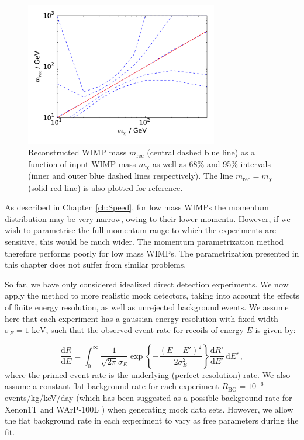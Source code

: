 \begin{figure}[t]
\centering
  \includegraphics[width=0.75\textwidth]{Poly/VaryingM.pdf}
  \caption{Reconstructed WIMP mass $m_\textrm{rec}$ (central dashed blue line) as a function of input WIMP mass $m_\chi$ as well as 68\% and 95\% intervals (inner and outer blue dashed lines respectively). The line $m_\textrm{rec} = m_\chi$ (solid red line) is also plotted for reference.}
  \label{fig:Poly:VaryingM}
\end{figure}

As described in Chapter~\ref{ch:Speed}, for low mass WIMPs the momentum distribution may be very narrow, owing to their lower momenta. However, if we wish to parametrise the full momentum range to which the experiments are sensitive, this would be much wider.  The momentum parametrization method therefore performs poorly for low mass WIMPs. The parametrization presented in this chapter does not suffer from similar problems.

So far, we have only considered idealized direct detection experiments. We now apply the method to more realistic mock detectors, taking into account the effects of finite energy resolution, as well as unrejected background events. We assume here that each experiment has a gaussian energy resolution with fixed width $\sigma_E = 1 \textrm{ keV}$, such that the observed event rate for recoils of energy $E$ is given by: 

\begin{equation}
\frac{\textrm{d}R}{\textrm{d}E} = \int_{0}^{\infty} \frac{1}{\sqrt{2 \pi} \sigma_E}\exp\left\{-\frac{(E-E')^2}{2\sigma_E^2}\right\} \frac{\textrm{d}{R'}}{\textrm{d}E'} \, \textrm{d}E'\,,
\end{equation}
where the primed event rate is the underlying (perfect resolution) rate. We also assume a constant flat background rate for each experiment $R_\textrm{BG} = 10^{-6}$ events/kg/keV/day (which has been suggested as a possible background rate for Xenon1T \cite{Aprile:2010} and WArP-100L \cite{Grandi:2005}) when generating mock data sets. However, we allow the flat background rate in each experiment to vary as free parameters during the fit.

